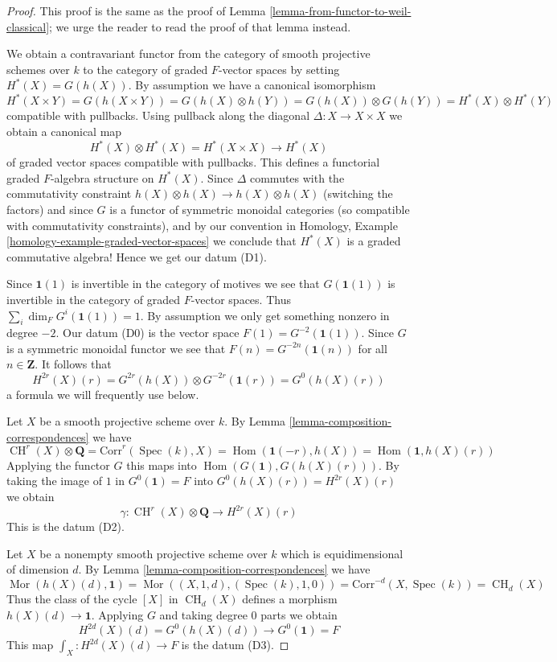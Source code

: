 \documentclass[10pt,a4paper]{amsart}
\theoremstyle{plain}
\theoremstyle{definition}
\theoremstyle{remark}
\numberwithin{equation}{subsection}
\def\Spec{\mathop{\mathrm{Spec}}}
\def\Hom{\mathop{\mathrm{Hom}}\nolimits}
\def\Mor{\mathop{\mathrm{Mor}}\nolimits}
\def\CH{\mathop{\mathrm{CH}}\nolimits}
\begin{document}
\begin{proof}
This proof is the same as the proof of
Lemma \ref{lemma-from-functor-to-weil-classical};
we urge the reader to read the proof of that lemma instead.

\medskip\noindent
We obtain a contravariant functor from the category of smooth
projective schemes over $k$ to the category of graded $F$-vector spaces
by setting $H^*(X) = G(h(X))$. By assumption we have a canonical
isomorphism
$$
H^*(X \times Y) = G(h(X \times Y)) = G(h(X) \otimes h(Y)) =
G(h(X)) \otimes G(h(Y)) = H^*(X) \otimes H^*(Y)
$$
compatible with pullbacks. Using pullback along the diagonal
$\Delta : X \to X \times X$ we obtain a canonical map
$$
H^*(X) \otimes H^*(X) = H^*(X \times X) \to H^*(X)
$$
of graded vector spaces compatible with pullbacks.
This defines a functorial graded $F$-algebra structure on
$H^*(X)$. Since $\Delta$ commutes with the commutativity
constraint $h(X) \otimes h(X) \to h(X) \otimes h(X)$ (switching the factors)
and since $G$ is a functor of symmetric monoidal categories (so compatible with
commutativity constraints), and by our convention in
Homology, Example \ref{homology-example-graded-vector-spaces}
we conclude that $H^*(X)$ is a graded
commutative algebra! Hence we get our datum (D1).

\medskip\noindent
Since $\mathbf{1}(1)$ is invertible in the category of motives
we see that $G(\mathbf{1}(1))$ is invertible in the category of
graded $F$-vector spaces. Thus $\sum_i \dim_F G^i(\mathbf{1}(1)) = 1$.
By assumption we only get something nonzero in degree $-2$.
Our datum (D0) is the vector space $F(1) = G^{-2}(\mathbf{1}(1))$.
Since $G$ is a symmetric monoidal functor we see that
$F(n) = G^{-2n}(\mathbf{1}(n))$ for all $n \in \mathbf{Z}$.
It follows that
$$
H^{2r}(X)(r) = G^{2r}(h(X)) \otimes G^{-2r}(\mathbf{1}(r)) =
G^0(h(X)(r))
$$
a formula we will frequently use below.

\medskip\noindent
Let $X$ be a smooth projective scheme over $k$. By
Lemma \ref{lemma-composition-correspondences} we have
$$
\CH^r(X) \otimes \mathbf{Q} = \text{Corr}^r(\Spec(k), X) =
\Hom(\mathbf{1}(-r), h(X)) = \Hom(\mathbf{1}, h(X)(r))
$$
Applying the functor $G$ this maps into
$\Hom(G(\mathbf{1}), G(h(X)(r)))$.
By taking the image of $1$ in $G^0(\mathbf{1}) = F$
into $G^0(h(X)(r)) = H^{2r}(X)(r)$ we obtain
$$
\gamma :
\CH^r(X) \otimes \mathbf{Q} \longrightarrow H^{2r}(X)(r)
$$
This is the datum (D2).

\medskip\noindent
Let $X$ be a nonempty smooth projective scheme over $k$
which is equidimensional of dimension $d$. By
Lemma \ref{lemma-composition-correspondences} we have
$$
\Mor(h(X)(d), \mathbf{1}) = \Mor((X, 1, d), (\Spec(k), 1, 0)) =
\text{Corr}^{-d}(X, \Spec(k)) = \CH_d(X)
$$
Thus the class of the cycle $[X]$ in $\CH_d(X)$ defines a morphism
$h(X)(d) \to \mathbf{1}$. Applying $G$ and taking degree $0$
parts we obtain
$$
H^{2d}(X)(d) = G^0(h(X)(d)) \longrightarrow G^0(\mathbf{1}) = F
$$
This map $\int_X : H^{2d}(X)(d) \to F$ is the datum (D3).


\end{proof}
\end{document}

